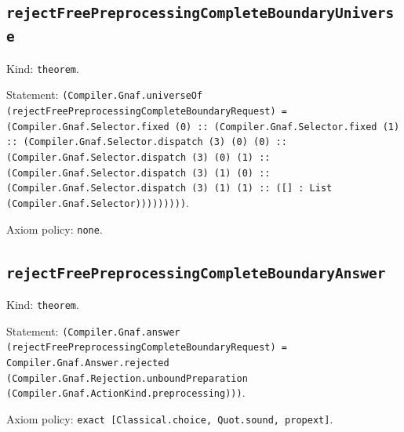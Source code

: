 \documentclass[11pt]{article}
\begin{document}
\subsection*{\texttt{rejectFreePreprocessingCompleteBoundaryUniverse}}
\noindent Kind: \texttt{theorem}.\par
\noindent Statement: \texttt{(Compiler.Gnaf.universeOf (rejectFreePreprocessingCompleteBoundaryRequest) = (Compiler.Gnaf.Selector.fixed (0) :: (Compiler.Gnaf.Selector.fixed (1) :: (Compiler.Gnaf.Selector.dispatch (3) (0) (0) :: (Compiler.Gnaf.Selector.dispatch (3) (0) (1) :: (Compiler.Gnaf.Selector.dispatch (3) (1) (0) :: (Compiler.Gnaf.Selector.dispatch (3) (1) (1) :: ([] : List (Compiler.Gnaf.Selector)))))))))}.\par
\noindent Axiom policy: \texttt{none}.\par
\subsection*{\texttt{rejectFreePreprocessingCompleteBoundaryAnswer}}
\noindent Kind: \texttt{theorem}.\par
\noindent Statement: \texttt{(Compiler.Gnaf.answer (rejectFreePreprocessingCompleteBoundaryRequest) = Compiler.Gnaf.Answer.rejected (Compiler.Gnaf.Rejection.unboundPreparation (Compiler.Gnaf.ActionKind.preprocessing)))}.\par
\noindent Axiom policy: \texttt{exact [Classical.choice, Quot.sound, propext]}.\par
\end{document}

